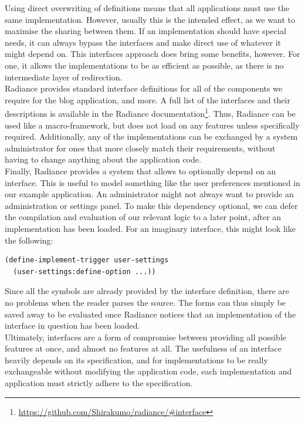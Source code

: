 \documentclass{sig-alternate}
\begin{document}
Using direct overwriting of definitions means that all applications must use the same implementation. However, usually this is the intended effect, as we want to maximise the sharing between them. If an implementation should have special needs, it can always bypass the interfaces and make direct use of whatever it might depend on. This interfaces approach does bring some benefits, however. For one, it allows the implementations to be as efficient as possible, as there is no intermediate layer of redirection. \\

Radiance provides standard interface definitions for all of the components we require for the blog application, and more. A full list of the interfaces and their descriptions is available in the Radiance documentation\footnote{\url{https://github.com/Shirakumo/radiance/\#interface}}. Thus, Radiance can be used like a macro-framework, but does not load on any features unless specifically required. Additionally, any of the implementations can be exchanged by a system administrator for ones that more closely match their requirements, without having to change anything about the application code.\\

Finally, Radiance provides a system that allows to optionally depend on an interface. This is useful to model something like the user preferences mentioned in our example application. An administrator might not always want to provide an administration or settings panel. To make this dependency optional, we can defer the compilation and evaluation of our relevant logic to a later point, after an implementation has been loaded. For an imaginary  interface, this might look like the following:

\begin{verbatim}
(define-implement-trigger user-settings
  (user-settings:define-option ...))
\end{verbatim}

Since all the symbols are already provided by the interface definition, there are no problems when the reader parses the source. The forms can thus simply be saved away to be evaluated once Radiance notices that an implementation of the interface in question has been loaded. \\

Ultimately, interfaces are a form of compromise between providing all possible features at once, and almost no features at all. The usefulness of an interface heavily depends on its specification, and for implementations to be really exchangeable without modifying the application code, each implementation and application must strictly adhere to the specification.
\end{document}

